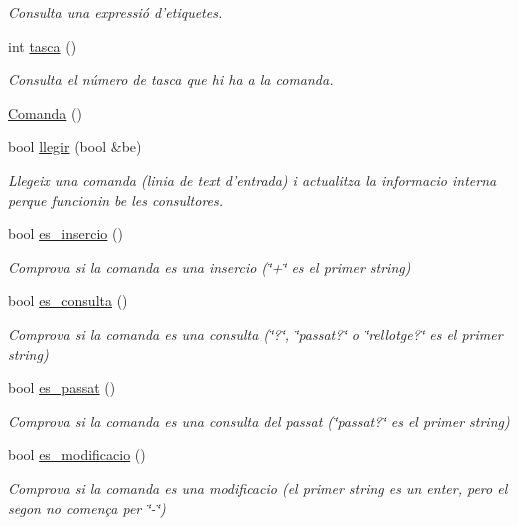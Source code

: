 \begin{DoxyCompactItemize}
\begin{DoxyCompactList}\small\item\em Consulta una expressió d'etiquetes. \end{DoxyCompactList}\item 
int \hyperlink{class_comanda_a67591051e9c5977c324ad8f8c3ac16e3}{tasca} ()
\begin{DoxyCompactList}\small\item\em Consulta el número de tasca que hi ha a la comanda. \end{DoxyCompactList}\item 
\hyperlink{class_comanda_a0f09e7aa5b7c15f131020d04bf5a8a94}{Comanda} ()
\item 
bool \hyperlink{class_comanda_af2dbc8ccdbb94bed6ea26155edc71b57}{llegir} (bool \&be)
\begin{DoxyCompactList}\small\item\em Llegeix una comanda (linia de text d'entrada) i actualitza la informacio interna perque funcionin be les consultores. \end{DoxyCompactList}\item 
bool \hyperlink{class_comanda_a614467bedacc9cf29cc5a9dcbba6b23d}{es\-\_\-insercio} ()
\begin{DoxyCompactList}\small\item\em Comprova si la comanda es una insercio (\char`\"{}+\char`\"{} es el primer string) \end{DoxyCompactList}\item 
bool \hyperlink{class_comanda_a847ee227fd7fea3a105dbd78735de453}{es\-\_\-consulta} ()
\begin{DoxyCompactList}\small\item\em Comprova si la comanda es una consulta (\char`\"{}?\char`\"{}, \char`\"{}passat?\char`\"{} o \char`\"{}rellotge?\char`\"{} es el primer string) \end{DoxyCompactList}\item 
bool \hyperlink{class_comanda_a1f435f8b605f0d1f5cbb06c8c6fe4005}{es\-\_\-passat} ()
\begin{DoxyCompactList}\small\item\em Comprova si la comanda es una consulta del passat (\char`\"{}passat?\char`\"{} es el primer string) \end{DoxyCompactList}\item 
bool \hyperlink{class_comanda_a2a33a5497c7d156f22065656cb48d9a1}{es\-\_\-modificacio} ()
\begin{DoxyCompactList}\small\item\em Comprova si la comanda es una modificacio (el primer string es un enter, pero el segon no comença per \char`\"{}-\/\char`\"{}) \end{DoxyCompactList}\item 

\end{DoxyCompactItemize}
